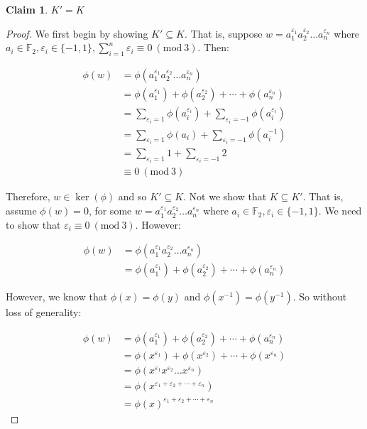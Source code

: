 \documentclass[12pt]{article}%
\newtheorem{claim}[theorem]{Claim}
\newcommand{\F}{\mathbb{F}}
\newcommand{\Mod}[1]{\ (\mathrm{mod}\ #1)}
\begin{document}
\begin{claim}
$K'=K$
\end{claim}

\begin{proof}
We first begin by showing $K' \subseteq K$. That is, suppose
$w=a_{1}^{\varepsilon_1}a_{2}^{\varepsilon_2}\ldots a_{n}^{\varepsilon_n}$ where $a_i\in \F_2,
\varepsilon_i\in \{-1, 1\}, \sum_{i=1}^{n} \varepsilon_i \equiv 0 \Mod{3}$. Then:

\begin{align*}
\phi(w)
&=\phi(a_{1}^{\varepsilon_1}a_{2}^{\varepsilon_2}\ldots a_{n}^{\varepsilon_n}) \\
&=\phi(a_{1}^{\varepsilon_1})+\phi(a_{2}^{\varepsilon_2})+\cdots +\phi(a_{n}^{\varepsilon_n}) \\
&=\sum_{\varepsilon_i=1}  \phi(a_{i}^{\varepsilon_i})+\sum_{\varepsilon_i=-1}  \phi(a_{i}^{\varepsilon_i}) \\
&=\sum_{\varepsilon_i=1}  \phi(a_{i})+\sum_{\varepsilon_i=-1}  \phi(a_{i}^{-1}) \\
&=\sum_{\varepsilon_i=1}  1+\sum_{\varepsilon_i=-1}  2 \\
&\equiv 0 \Mod{3}
\end{align*}

Therefore, $w\in \ker(\phi)$ and so $K' \subseteq K$. Not we show that $K \subseteq K'$. That is, assume
$\phi(w)=0$, for some $w=a_{1}^{\varepsilon_1}a_{2}^{\varepsilon_2}\ldots a_{n}^{\varepsilon_n}$ where
$a_i\in \F_2, \varepsilon_i\in \{-1, 1\}$. We need to show that $\varepsilon_i \equiv 0 \Mod{3}$. However:

\begin{align*}
\phi(w)
&=\phi(a_{1}^{\varepsilon_1}a_{2}^{\varepsilon_2}\ldots a_{n}^{\varepsilon_n}) \\
&=\phi(a_{1}^{\varepsilon_1})+\phi(a_{2}^{\varepsilon_2})+\cdots +\phi(a_{n}^{\varepsilon_n})
\end{align*}

However, we know that $\phi(x)=\phi(y)$ and $\phi(x^{-1})=\phi(y^{-1})$. So without loss of generality:

\begin{align*}
\phi(w)
&=\phi(a_{1}^{\varepsilon_1})+\phi(a_{2}^{\varepsilon_2})+\cdots +\phi(a_{n}^{\varepsilon_n}) \\
&=\phi(x^{\varepsilon_1})+\phi(x^{\varepsilon_2})+\cdots +\phi(x^{\varepsilon_n}) \\
&=\phi(x^{\varepsilon_1}x^{\varepsilon_2}\ldots x^{\varepsilon_n}) \\
&=\phi(x^{\varepsilon_1+\varepsilon_2+\cdots +\varepsilon_n}) \\
&=\phi(x)^{\varepsilon_1+\varepsilon_2+\cdots +\varepsilon_n}
\end{align*}


\end{proof}
\end{document}
